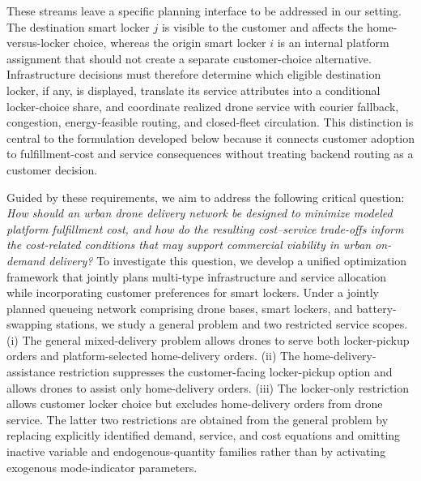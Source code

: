 \documentclass[final,3p,authoryear]{elsarticle}
\begin{document}
These streams leave a specific planning interface to be addressed in our setting.
The destination smart locker $j$ is visible to the customer and affects the home-versus-locker choice, whereas the origin smart locker $i$ is an internal platform assignment that should not create a separate customer-choice alternative.
Infrastructure decisions must therefore determine which eligible destination locker, if any, is displayed, translate its service attributes into a conditional locker-choice share, and coordinate realized drone service with courier fallback, congestion, energy-feasible routing, and closed-fleet circulation.
This distinction is central to the formulation developed below because it connects customer adoption to fulfillment-cost and service consequences without treating backend routing as a customer decision.


Guided by these requirements, we aim to address the following critical question:
\textit{How should an urban drone delivery network be designed to minimize modeled platform fulfillment cost, and how do the resulting cost--service trade-offs inform the cost-related conditions that may support commercial viability in urban on-demand delivery?}
To investigate this question, we develop a unified optimization framework that jointly plans multi-type infrastructure and service allocation while incorporating customer preferences for smart lockers.
Under a jointly planned queueing network comprising drone bases, smart lockers, and battery-swapping stations, we study a general problem and two restricted service scopes.
(i) The general mixed-delivery problem allows drones to serve both locker-pickup orders and platform-selected home-delivery orders.
(ii) The home-delivery-assistance restriction suppresses the customer-facing locker-pickup option and allows drones to assist only home-delivery orders.
(iii) The locker-only restriction allows customer locker choice but excludes home-delivery orders from drone service.
The latter two restrictions are obtained from the general problem by replacing explicitly identified demand, service, and cost equations and omitting inactive variable and endogenous-quantity families rather than by activating exogenous mode-indicator parameters.
\end{document}
